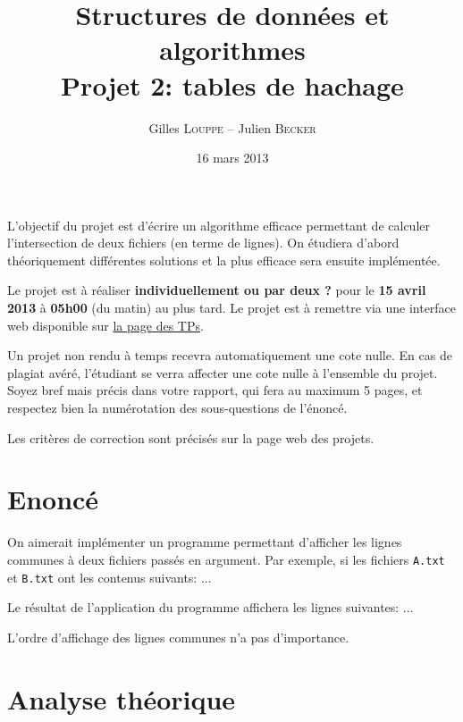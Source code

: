 \documentclass[a4paper,10pt]{article}
\title{
    \textbf{Structures de données et algorithmes}\\
    Projet 2: tables de hachage
}
\author{Gilles \textsc{Louppe} -- Julien \textsc{Becker}}
\date{16 mars 2013}
\begin{document}
\maketitle

L'objectif du projet est d'écrire un algorithme efficace permettant de
calculer l'intersection de deux fichiers (en terme de lignes). On
étudiera d'abord théoriquement différentes solutions et la plus
efficace sera ensuite implémentée.

Le projet est à réaliser {\bf individuellement ou par deux ?} pour le {\bf 15 avril 2013} à
{\bf 05h00} (du matin) au plus tard. Le projet est à remettre via une interface
web disponible sur \href{http://www.montefiore.ulg.ac.be/~glouppe/2012-2013/students.info0902.php}{la page des TPs}.

Un projet non rendu à temps recevra automatiquement une cote nulle. En
cas de plagiat avéré, l'étudiant se verra affecter une cote nulle à
l'ensemble du projet. Soyez bref mais précis dans votre rapport, qui
fera au maximum 5 pages, et respectez bien la numérotation des
sous-questions de l'énoncé.

Les critères de correction sont précisés sur la page web des projets.

\section{Enoncé}

On aimerait implémenter un programme permettant d'afficher les lignes
communes à deux fichiers passés en argument. Par exemple, si les
fichiers \texttt{A.txt} et \texttt{B.txt} ont les contenus suivants:
...

Le résultat de l'application du programme affichera les lignes suivantes: ...

L'ordre d'affichage des lignes communes n'a pas d'importance.

\section{Analyse théorique}
\end{document}
